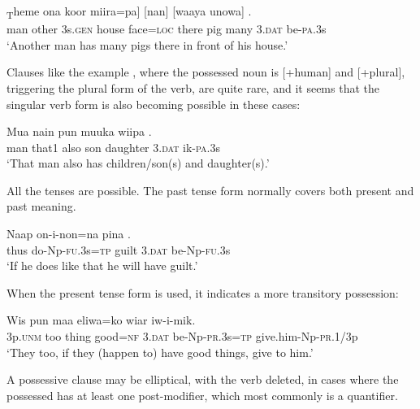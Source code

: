 \ea%
\label{ex:5:x972}
\textsubscript{T}heme  ona  koor  miira=pa]  [nan]  [waaya unowa]   . \\
     man  other  3s.\textsc{gen}  house  face=\textsc{loc}  there  pig many  3.\textsc{dat}  be-\textsc{pa}.3s \\
\glt `Another man has many pigs there in front of his house.'
\z

Clauses like the example , where the possessed noun is [+human] and [+plural], triggering the plural form of the verb, are quite rare, and it seems that the singular verb form is also becoming possible in these cases:

\ea%
\label{ex:5:x1321}
\gll Mua  nain  pun  muuka  wiipa   . \\
     man  that1  also  son  daughter  3.\textsc{dat}  ik-\textsc{pa}.3s \\
\glt `That man also has children/son(s) and daughter(s).'
\z

All the tenses are possible. The past tense form normally covers both present and past meaning.

\ea%
\label{ex:5:x1066}
\gll Naap  on-i-non=na  pina   . \\
     thus  do-Np-\textsc{fu}.3s=\textsc{tp}  guilt  3.\textsc{dat}  be-Np-\textsc{fu}.3s \\
\glt `If he does like that he will have guilt.'
\z

When the present tense form is used, it indicates a more transitory possession:

\ea%
\label{ex:5:x1201}
\gll Wis  pun  maa  eliwa=ko  wiar   iw-i-mik. \\
     3p.\textsc{unm}  too  thing  good=\textsc{nf}  3.\textsc{dat}  be-Np-\textsc{pr}.3s=\textsc{tp} give.him-Np-\textsc{pr}.1/3p \\
\glt `They too, if they (happen to) have good things, give to him.'
\z

A possessive clause may be elliptical, with the verb deleted, in cases where the possessed  has at least one post-modifier, which most commonly is a quantifier.

